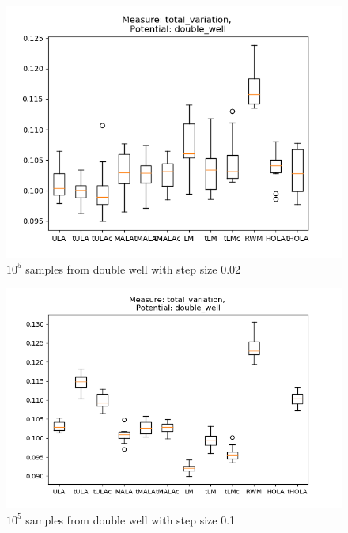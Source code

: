 \begin{figure}[ht!]
	\centering
		\includegraphics[height=0.43\textheight]{WriteUp/TV_doublewell_step0pt02.png}
	\caption{$10^5$ samples from double well with step size 0.02}
	\label{fig:TVdouble02}
\end{figure}

\begin{figure}[ht!]
	\centering
		\includegraphics[height=0.43\textheight]{WriteUp/TV_doublewell_step0pt1.png}
	\caption{$10^5$ samples from double well with step size 0.1}
	\label{fig:TVdouble1}
\end{figure}

